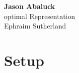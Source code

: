 
\usepackage[font=scriptsize]{caption}



\begin{center}
	{\large \bf Jason Abaluck }   \\ \large optimal Representation \\ Ephraim Sutherland
\end{center}

\tableofcontents




\section{Setup}


